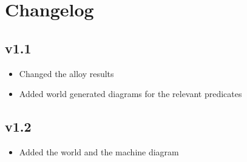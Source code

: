 \chapter{Changelog}

\section{v1.1}
\begin{itemize}
	\item Changed the alloy results 
	\item Added world generated diagrams for the relevant predicates
\end{itemize}

\section{v1.2}
\begin{itemize}
	\item Added the world and the machine diagram
\end{itemize}